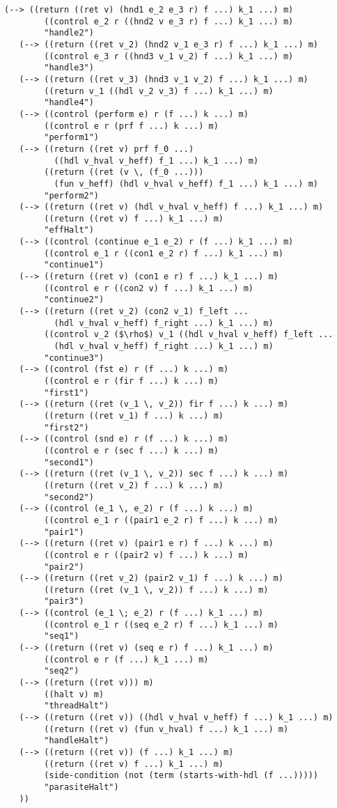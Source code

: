 \documentclass[12pt,a4paper,twoside,openright]{report}
\begin{document}
\begin{lstlisting}[xleftmargin=0cm, xrightmargin=0cm]
   (--> ((return ((ret v) (hnd1 e_2 e_3 r) f ...) k_1 ...) m)
        ((control e_2 r ((hnd2 v e_3 r) f ...) k_1 ...) m)
        "handle2")
   (--> ((return ((ret v_2) (hnd2 v_1 e_3 r) f ...) k_1 ...) m)
        ((control e_3 r ((hnd3 v_1 v_2) f ...) k_1 ...) m)
        "handle3")
   (--> ((return ((ret v_3) (hnd3 v_1 v_2) f ...) k_1 ...) m)
        ((return v_1 ((hdl v_2 v_3) f ...) k_1 ...) m)
        "handle4")
   (--> ((control (perform e) r (f ...) k ...) m)
        ((control e r (prf f ...) k ...) m)
        "perform1")
   (--> ((return ((ret v) prf f_0 ...)
          ((hdl v_hval v_heff) f_1 ...) k_1 ...) m)
        ((return ((ret (v \, (f_0 ...)))
          (fun v_heff) (hdl v_hval v_heff) f_1 ...) k_1 ...) m)
        "perform2")
   (--> ((return ((ret v) (hdl v_hval v_heff) f ...) k_1 ...) m)
        ((return ((ret v) f ...) k_1 ...) m)
        "effHalt")
   (--> ((control (continue e_1 e_2) r (f ...) k_1 ...) m)
        ((control e_1 r ((con1 e_2 r) f ...) k_1 ...) m)
        "continue1")
   (--> ((return ((ret v) (con1 e r) f ...) k_1 ...) m)
        ((control e r ((con2 v) f ...) k_1 ...) m)
        "continue2")
   (--> ((return ((ret v_2) (con2 v_1) f_left ...
          (hdl v_hval v_heff) f_right ...) k_1 ...) m)
        ((control v_2 ($\rho$) v_1 ((hdl v_hval v_heff) f_left ...
          (hdl v_hval v_heff) f_right ...) k_1 ...) m)
        "continue3")
   (--> ((control (fst e) r (f ...) k ...) m)
        ((control e r (fir f ...) k ...) m)
        "first1")
   (--> ((return ((ret (v_1 \, v_2)) fir f ...) k ...) m)
        ((return ((ret v_1) f ...) k ...) m)
        "first2")
   (--> ((control (snd e) r (f ...) k ...) m)
        ((control e r (sec f ...) k ...) m)
        "second1")
   (--> ((return ((ret (v_1 \, v_2)) sec f ...) k ...) m)
        ((return ((ret v_2) f ...) k ...) m)
        "second2")
   (--> ((control (e_1 \, e_2) r (f ...) k ...) m)
        ((control e_1 r ((pair1 e_2 r) f ...) k ...) m)
        "pair1")
   (--> ((return ((ret v) (pair1 e r) f ...) k ...) m)
        ((control e r ((pair2 v) f ...) k ...) m)
        "pair2")
   (--> ((return ((ret v_2) (pair2 v_1) f ...) k ...) m)
        ((return ((ret (v_1 \, v_2)) f ...) k ...) m)
        "pair3")
   (--> ((control (e_1 \; e_2) r (f ...) k_1 ...) m)
        ((control e_1 r ((seq e_2 r) f ...) k_1 ...) m)
        "seq1")
   (--> ((return ((ret v) (seq e r) f ...) k_1 ...) m)
        ((control e r (f ...) k_1 ...) m)
        "seq2")
   (--> ((return ((ret v))) m)
        ((halt v) m)
        "threadHalt")
   (--> ((return ((ret v)) ((hdl v_hval v_heff) f ...) k_1 ...) m)
        ((return ((ret v) (fun v_hval) f ...) k_1 ...) m)
        "handleHalt")
   (--> ((return ((ret v)) (f ...) k_1 ...) m)
        ((return ((ret v) f ...) k_1 ...) m)
        (side-condition (not (term (starts-with-hdl (f ...)))))
        "parasiteHalt")
   ))


\end{lstlisting}
\end{document}
